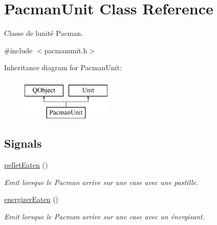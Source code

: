 \hypertarget{class_pacman_unit}{}\section{Pacman\+Unit Class Reference}
\label{class_pacman_unit}


Classe de l\textquotesingle{}unité Pacman.  




{\ttfamily \#include $<$pacmanunit.\+h$>$}

Inheritance diagram for Pacman\+Unit\+:\begin{figure}[H]
\begin{center}
\leavevmode
\includegraphics[height=2.000000cm]{class_pacman_unit}
\end{center}
\end{figure}
\subsection*{Signals}
\begin{DoxyCompactItemize}
\item 
\hypertarget{class_pacman_unit_a7ecbacb0b7f442cd8e8c2483ed89cade}{}\hyperlink{class_pacman_unit_a7ecbacb0b7f442cd8e8c2483ed89cade}{pellet\+Eaten} ()\label{class_pacman_unit_a7ecbacb0b7f442cd8e8c2483ed89cade}

\begin{DoxyCompactList}\small\item\em Emit lorsque le Pacman arrive sur une case avec une pastille. \end{DoxyCompactList}\item 
\hypertarget{class_pacman_unit_a6723905915943bae1bcadb1cb91a2775}{}\hyperlink{class_pacman_unit_a6723905915943bae1bcadb1cb91a2775}{energizer\+Eaten} ()\label{class_pacman_unit_a6723905915943bae1bcadb1cb91a2775}

\begin{DoxyCompactList}\small\item\em Emit lorsque le Pacman arrive sur une case avec un énergisant. \end{DoxyCompactList}\end{DoxyCompactItemize}
